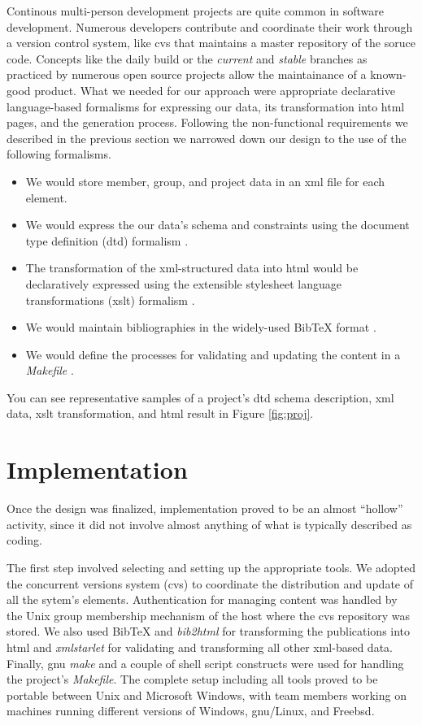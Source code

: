 \documentclass[10pt]{article}
\begin{document}
Continous multi-person development projects are quite
common in software development.
Numerous developers contribute and coordinate their work
through a version control system, like {\sc cvs} that
maintains a master repository of the soruce code.
Concepts like the daily build \cite{CS95b} or the
{\em current} and {\em stable} branches as practiced by
numerous open source projects allow the maintainance
of a known-good product.
What we needed for our approach were appropriate
declarative language-based formalisms for expressing our data,
its transformation into {\sc html} pages, and the
generation process.
Following the non-functional requirements we described in the
previous section we narrowed down our design to the use of the
following formalisms.
\begin{itemize}
\item We would store member, group, and project data
in an {\sc xml} file for each element.
\item We would express the our data's schema and
constraints using the document type definition
({\sc dtd}) formalism \cite{HM01}.
\item The transformation of the {\sc xml}-structured data
into {\sc html} would be declaratively expressed using
the extensible stylesheet language transformations ({\sc xslt})
formalism \cite{HM01}.
\item We would maintain bibliographies in the
widely-used BibTeX format \cite{Lam94}.
\item We would define the processes for
validating and updating the content in a {\em Makefile} \cite{OTT91}.
\end{itemize}
You can see representative samples of a project's
{\sc dtd} schema description,
{\sc xml} data,
{\sc xslt} transformation,
and {\sc html} result in Figure \ref{fig:proj}.


\section{Implementation}
Once the design was finalized,
implementation proved to be an almost ``hollow'' activity,
since it did not involve almost anything of what
is typically described as coding.

The first step involved selecting and setting up the
appropriate tools.
We adopted the concurrent versions system
({\sc cvs}) \cite{BF01} to coordinate the distribution
and update of all the sytem's elements.
Authentication for managing content was handled by the
Unix group membership mechanism of the host where the
{\sc cvs} repository was stored.
We also used
BibTeX and {\em bib2html} for transforming the publications
into {\sc html} and
{\em xmlstarlet} for validating and transforming
all other {\sc xml}-based data.
Finally, {\sc gnu} {\em make} and a couple of shell script
constructs were used for handling the project's {\em Makefile}.
The complete setup including all tools proved to be portable
between Unix and Microsoft Windows, with team members working
on machines running different versions of Windows, {\sc gnu}/Linux,
and Free{\sc bsd}.
\end{document}
